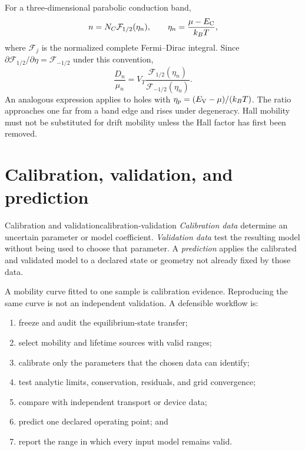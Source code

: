 For a three-dimensional parabolic conduction band,
\begin{equation}
 n=N_C\mathcal F_{1/2}(\eta_n),
 \qquad
 \eta_n=\frac{\mu-E_{\mathrm C}}{k_BT},
 \label{eq:fermi-density-reduced-potential}
\end{equation}
where $\mathcal F_j$ is the normalized complete Fermi--Dirac integral.  Since
$\partial\mathcal F_{1/2}/\partial\eta=\mathcal F_{-1/2}$ under this convention,
\begin{equation}
 \boxed{
 \frac{D_n}{\mu_n}
 =V_T\frac{\mathcal F_{1/2}(\eta_n)}
 {\mathcal F_{-1/2}(\eta_n)}.
 }
 \label{eq:generalized-einstein-fermi}
\end{equation}
An analogous expression applies to holes with
$\eta_p=(E_{\mathrm V}-\mu)/(k_BT)$.  The ratio approaches one far from a band edge and
rises under degeneracy.  Hall mobility must not be substituted for drift
mobility unless the Hall factor has first been removed.

\section{Calibration, validation, and prediction}

\begin{definition}{Calibration and validation}{calibration-validation}
\emph{Calibration data} determine an uncertain parameter or model coefficient.
\emph{Validation data} test the resulting model without being used to choose
that parameter.  A \emph{prediction} applies the calibrated and validated model
to a declared state or geometry not already fixed by those data.
\end{definition}

A mobility curve fitted to one sample is calibration evidence.  Reproducing the
same curve is not an independent validation.  A defensible workflow is:

\begin{enumerate}
 \item freeze and audit the equilibrium-state transfer;
 \item select mobility and lifetime sources with valid ranges;
 \item calibrate only the parameters that the chosen data can identify;
 \item test analytic limits, conservation, residuals, and grid convergence;
 \item compare with independent transport or device data;
 \item predict one declared operating point; and
 \item report the range in which every input model remains valid.
\end{enumerate}

